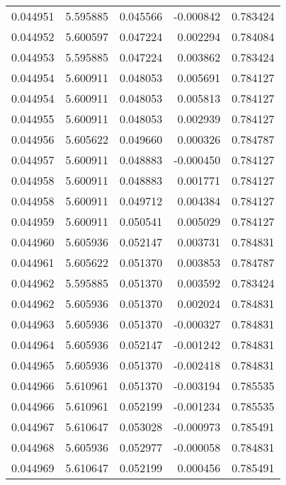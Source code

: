\begin{tabular}{lrrrr}
0.044951    &  5.595885 &  0.045566 & -0.000842 &             0.783424 \\
0.044952    &  5.600597 &  0.047224 &  0.002294 &             0.784084 \\
0.044953    &  5.595885 &  0.047224 &  0.003862 &             0.783424 \\
0.044954    &  5.600911 &  0.048053 &  0.005691 &             0.784127 \\
0.044954    &  5.600911 &  0.048053 &  0.005813 &             0.784127 \\
0.044955    &  5.600911 &  0.048053 &  0.002939 &             0.784127 \\
0.044956    &  5.605622 &  0.049660 &  0.000326 &             0.784787 \\
0.044957    &  5.600911 &  0.048883 & -0.000450 &             0.784127 \\
0.044958    &  5.600911 &  0.048883 &  0.001771 &             0.784127 \\
0.044958    &  5.600911 &  0.049712 &  0.004384 &             0.784127 \\
0.044959    &  5.600911 &  0.050541 &  0.005029 &             0.784127 \\
0.044960    &  5.605936 &  0.052147 &  0.003731 &             0.784831 \\
0.044961    &  5.605622 &  0.051370 &  0.003853 &             0.784787 \\
0.044962    &  5.595885 &  0.051370 &  0.003592 &             0.783424 \\
0.044962    &  5.605936 &  0.051370 &  0.002024 &             0.784831 \\
0.044963    &  5.605936 &  0.051370 & -0.000327 &             0.784831 \\
0.044964    &  5.605936 &  0.052147 & -0.001242 &             0.784831 \\
0.044965    &  5.605936 &  0.051370 & -0.002418 &             0.784831 \\
0.044966    &  5.610961 &  0.051370 & -0.003194 &             0.785535 \\
0.044966    &  5.610961 &  0.052199 & -0.001234 &             0.785535 \\
0.044967    &  5.610647 &  0.053028 & -0.000973 &             0.785491 \\
0.044968    &  5.605936 &  0.052977 & -0.000058 &             0.784831 \\
0.044969    &  5.610647 &  0.052199 &  0.000456 &             0.785491 \\

\end{tabular}
